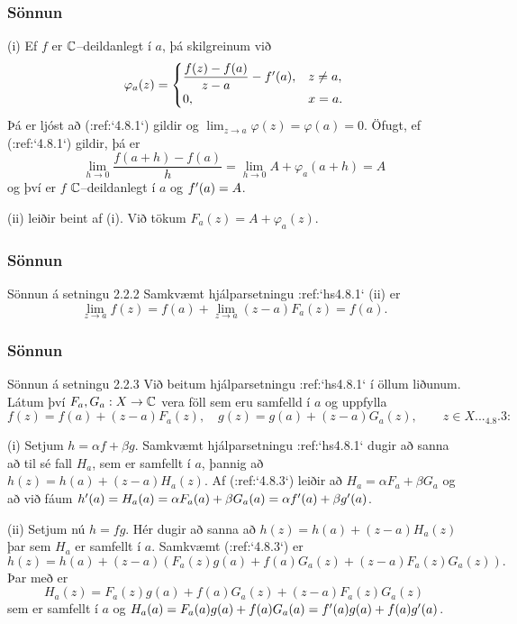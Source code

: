 \subsubsection{Sönnun} (i) Ef $f$ er ${\mathbb C}$--deildanlegt í $a$, þá skilgreinum við 
$$
\varphi_a(z)=\begin{cases}
\dfrac{f(z)-f(a)}{z-a}-f{\sp{\prime}}(a),& z\neq a,\\ 
0,& x=a.\end{cases}
$$
Þá er ljóst að (:ref:`4.8.1`) gildir og $\lim_{z\to a}\varphi(z)=\varphi(a)=0$. 
Öfugt, ef (:ref:`4.8.1`) gildir, þá er 
$$
\lim\limits_{h\to 0} \dfrac{f(a+h)-f(a)}h=
\lim\limits_{h\to 0}A+\varphi_a(a+h)=A
$$
og því er $f$ ${\mathbb C}$--deildanlegt í $a$ og $f{\sp{\prime}}(a)=A$.

\smallskip
(ii) leiðir beint af (i).  Við tökum  $F_a(z)=A+\varphi_a(z)$.


\subsubsection{Sönnun}{Sönnun á setningu 2.2.2}  Samkvæmt hjálparsetningu
:ref:`hs4.8.1` (ii) er
$$\lim_{z\to a} f(z)=f(a)+\lim_{z\to a} (z-a)F_a(z)=f(a).
$$



\subsubsection{Sönnun}{Sönnun á setningu 2.2.3}   Við beitum hjálparsetningu
:ref:`hs4.8.1`
 í öllum  liðunum.
Látum því $F_a,G_a:X\to {\mathbb C}$ vera föll sem eru samfelld í $a$ og uppfylla
\begin{equation}
f(z)=f(a)+(z-a)F_a(z), \quad g(z)=g(a)+(z-a)G_a(z), \qquad z\in X.


.. _4.8.3:

\end{equation}

(i) Setjum $h=\alpha f+\beta g$.  Samkvæmt hjálparsetningu
:ref:`hs4.8.1`
dugir að sanna að til sé fall $H_a$, sem er samfellt í $a$, þannig að
$h(z)=h(a)+(z-a)H_a(z)$.  Af (:ref:`4.8.3`) leiðir að 
$H_a=\alpha F_a+\beta G_a$ og að við fáum $h{\sp{\prime}}(a)=H_a(a)=\alpha F_a(a)+\beta
G_a(a)=\alpha f{\sp{\prime}}(a)+\beta g{\sp{\prime}}(a)$. 

(ii)  Setjum nú $h=fg$.  Hér dugir að sanna að
$h(z)=h(a)+(z-a)H_a(z)$
þar sem $H_a$ er samfellt í $a$.  Samkvæmt (:ref:`4.8.3`) er
 $$h(z)=h(a)+(z-a)\left(F_a(z)g(a)+f(a)G_a(z)+(z-a)F_a(z)G_a(z)\right).
 $$
Þar með er 
 $$H_a(z)=F_a(z)g(a)+f(a)G_a(z)+(z-a)F_a(z)G_a(z)
 $$
sem er samfellt í $a$ og
$H_a(a)=F_a(a)g(a)+f(a)G_a(a)=f{\sp{\prime}}(a)g(a)+f(a)g{\sp{\prime}}(a)$. 

